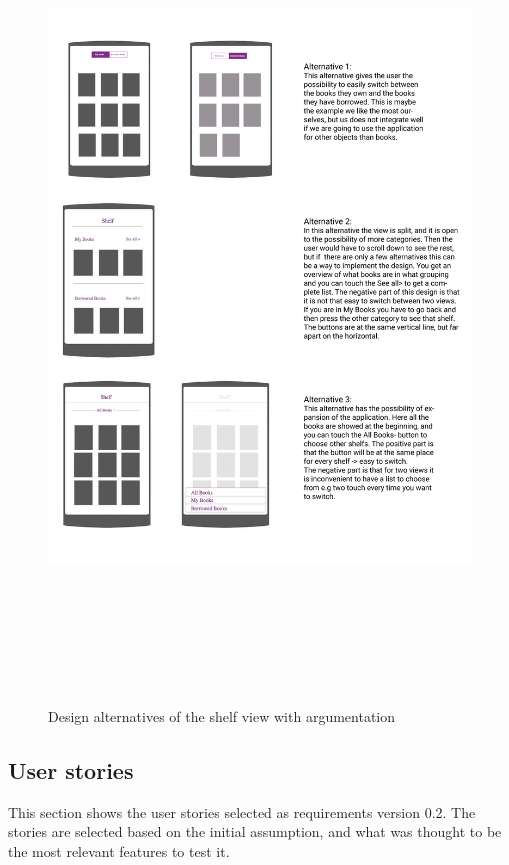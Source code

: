 \begin{figure}
\centering
\includegraphics[height=22cm]{figs/v02/design-alternatives.png}
\caption{Design alternatives of the shelf view with argumentation }
\label{fig:design-alternatives-v2}
\end{figure}

\newpage
\subsection{User stories}
\label{user-stories-v2}
This section shows the user stories selected as requirements version 0.2. The stories are selected based on the initial assumption, and what was thought to be the most relevant features to test it. 

